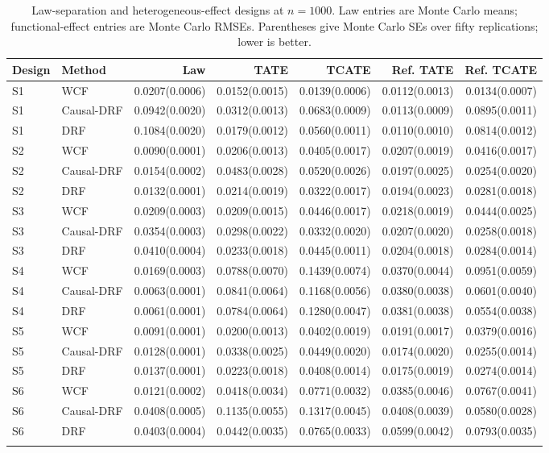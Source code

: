 \begin{table}[t]
\centering
\scriptsize
\setlength{\tabcolsep}{4pt}
\caption{Law-separation and heterogeneous-effect designs at $n=1000$. Law entries are Monte Carlo means; functional-effect entries are Monte Carlo RMSEs. Parentheses give Monte Carlo SEs over fifty replications; lower is better.}
\label{tab:full_results_s}
\begin{tabular}{llrrrrr}
\toprule
Design & Method & Law & TATE & TCATE & Ref. TATE & Ref. TCATE \\
\midrule
S1 & WCF & 0.0207(0.0006) & 0.0152(0.0015) & 0.0139(0.0006) & 0.0112(0.0013) & 0.0134(0.0007) \\
S1 & Causal-DRF & 0.0942(0.0020) & 0.0312(0.0013) & 0.0683(0.0009) & 0.0113(0.0009) & 0.0895(0.0011) \\
S1 & DRF & 0.1084(0.0020) & 0.0179(0.0012) & 0.0560(0.0011) & 0.0110(0.0010) & 0.0814(0.0012) \\
\addlinespace
S2 & WCF & 0.0090(0.0001) & 0.0206(0.0013) & 0.0405(0.0017) & 0.0207(0.0019) & 0.0416(0.0017) \\
S2 & Causal-DRF & 0.0154(0.0002) & 0.0483(0.0028) & 0.0520(0.0026) & 0.0197(0.0025) & 0.0254(0.0020) \\
S2 & DRF & 0.0132(0.0001) & 0.0214(0.0019) & 0.0322(0.0017) & 0.0194(0.0023) & 0.0281(0.0018) \\
\addlinespace
S3 & WCF & 0.0209(0.0003) & 0.0209(0.0015) & 0.0446(0.0017) & 0.0218(0.0019) & 0.0444(0.0025) \\
S3 & Causal-DRF & 0.0354(0.0003) & 0.0298(0.0022) & 0.0332(0.0020) & 0.0207(0.0020) & 0.0258(0.0018) \\
S3 & DRF & 0.0410(0.0004) & 0.0233(0.0018) & 0.0445(0.0011) & 0.0204(0.0018) & 0.0284(0.0014) \\
\addlinespace
S4 & WCF & 0.0169(0.0003) & 0.0788(0.0070) & 0.1439(0.0074) & 0.0370(0.0044) & 0.0951(0.0059) \\
S4 & Causal-DRF & 0.0063(0.0001) & 0.0841(0.0064) & 0.1168(0.0056) & 0.0380(0.0038) & 0.0601(0.0040) \\
S4 & DRF & 0.0061(0.0001) & 0.0784(0.0064) & 0.1280(0.0047) & 0.0381(0.0038) & 0.0554(0.0038) \\
\addlinespace
S5 & WCF & 0.0091(0.0001) & 0.0200(0.0013) & 0.0402(0.0019) & 0.0191(0.0017) & 0.0379(0.0016) \\
S5 & Causal-DRF & 0.0128(0.0001) & 0.0338(0.0025) & 0.0449(0.0020) & 0.0174(0.0020) & 0.0255(0.0014) \\
S5 & DRF & 0.0137(0.0001) & 0.0223(0.0018) & 0.0408(0.0014) & 0.0175(0.0019) & 0.0274(0.0014) \\
\addlinespace
S6 & WCF & 0.0121(0.0002) & 0.0418(0.0034) & 0.0771(0.0032) & 0.0385(0.0046) & 0.0767(0.0041) \\
S6 & Causal-DRF & 0.0408(0.0005) & 0.1135(0.0055) & 0.1317(0.0045) & 0.0408(0.0039) & 0.0580(0.0028) \\
S6 & DRF & 0.0403(0.0004) & 0.0442(0.0035) & 0.0765(0.0033) & 0.0599(0.0042) & 0.0793(0.0035) \\
\addlinespace
\bottomrule
\end{tabular}
\end{table}
